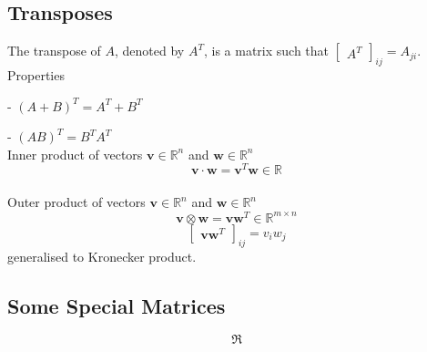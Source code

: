 \subsection{Transposes}
The transpose of $A$, denoted by $A^T$, is a matrix such that $\begin{bmatrix}
    A^T
\end{bmatrix}_{ij} = A_{ji}$.\\
Properties

- $(A+B)^T=A^T+B^T$

- $(AB)^T = B^TA^T$\\
Inner product of vectors $\mathbf{v}\in\mathbb{R}^n$ and $\mathbf{w}\in\mathbb{R}^n$
$$\mathbf{v}\cdot\mathbf{w} = \mathbf{v}^T\mathbf{w}\in\mathbb{R}$$\\
Outer product of vectors $\mathbf{v}\in\mathbb{R}^n$ and $\mathbf{w}\in\mathbb{R}^n$
$$\mathbf{v}\otimes\mathbf{w}=\mathbf{v}\mathbf{w}^T\in\mathbb{R}^{m\times n}$$
$$\begin{bmatrix}
    \mathbf{vw}^T
\end{bmatrix}_{ij}=v_iw_j$$
generalised to Kronecker product.

\subsection{Some Special Matrices}
$$\Re$$
